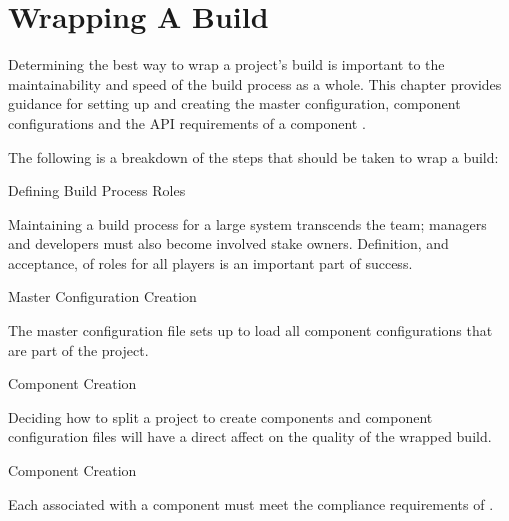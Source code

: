 %
%
%
%
\chapter{Wrapping A Build}\label{chap:wrapping}

Determining the best way to wrap a project's build is important to the
maintainability and speed of the build process as a whole.  This
chapter provides guidance for setting up and creating the master
configuration, component configurations and the API requirements of a
component \makefile.

The following is a breakdown of the steps that should be taken to
wrap a build:

\begin{description}
\item{Defining Build Process Roles}

  Maintaining a build process for a large system transcends the \bni
  team; managers and developers must also become involved stake
  owners.  Definition, and acceptance, of roles for all players is an
  important part of success.

\item{Master Configuration Creation}

  The master configuration file sets up \lmsbw to load all component
  configurations that are part of the project.

\item{Component Creation}

  Deciding how to split a project to create components and component
  configuration files will have a direct affect on the quality of the
  wrapped build.

\item{Component \makefile Creation}

  Each \makefile associated with a component must meet the compliance
  requirements of \lmsbw.

\end{description}

